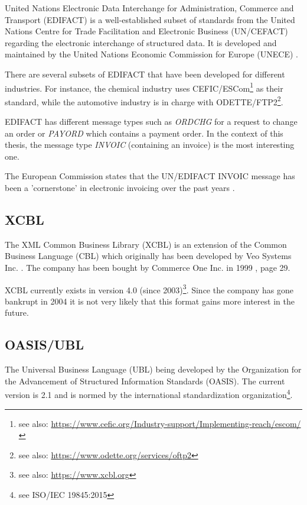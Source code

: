 United Nations Electronic Data Interchange for Administration, Commerce and Transport (EDIFACT) is a well-established \cite{basware} subset of standards from the United Nations Centre for Trade Facilitation and Electronic Business (UN/CEFACT) regarding the electronic interchange of structured data. It is developed and maintained by the United Nations Economic Commission for Europe (UNECE) \cite{unece}.

There are several subsets of EDIFACT that have been developed for different industries. For instance, the chemical industry uses CEFIC/ESCom\footnote{see also: \url{https://www.cefic.org/Industry-support/Implementing-reach/escom/}} as their standard, while the automotive industry is in charge with ODETTE/FTP2\footnote{see also: \url{https://www.odette.org/services/oftp2}}.

EDIFACT has different message types such as \emph{ORDCHG} for a request to change an order or \emph{PAYORD} which contains a payment order. In the context of this thesis, the message type \emph{INVOIC} (containing an invoice) is the most interesting one.

The European Commission states that the UN/EDIFACT INVOIC message has been a 'cornerstone' in electronic invoicing over the past years \cite[page 14]{ec12}.

\subsection{XCBL}
\label{sec2.1.2}

The XML Common Business Library (XCBL) is an extension of the Common Business Language (CBL) which originally has been developed by Veo Systems Inc. \cite{coverpages}. The company has been bought by Commerce One Inc. in 1999 \cite{co}, page 29. 

XCBL currently exists in version 4.0 (since 2003)\footnote{see also: \url{https://www.xcbl.org}}. Since the company has gone bankrupt in 2004 \cite{scm} it is not very likely that this format gains more interest in the future.

\subsection{OASIS/UBL}
\label{sec2.1.3}

The Universal Business Language (UBL) being developed by the Organization for the Advancement of Structured Information Standards (OASIS). The current version is 2.1 and is normed by the international standardization organization\footnote{see ISO/IEC 19845:2015}.

